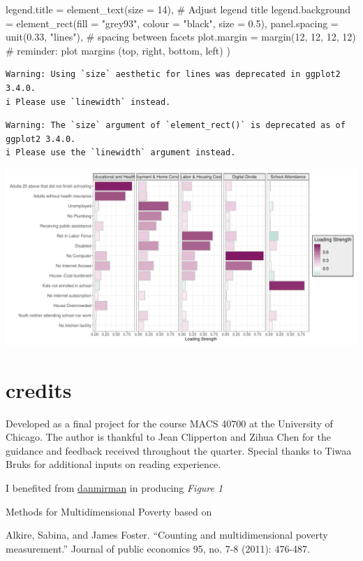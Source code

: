 \documentclass[
  letterpaper,
  DIV=11,
  numbers=noendperiod]{scrreprt}
\newenvironment{Shaded}{\begin{snugshade}}{\end{snugshade}}
\newcommand{\AttributeTok}[1]{\textcolor[rgb]{0.40,0.45,0.13}{#1}}
\newcommand{\CommentTok}[1]{\textcolor[rgb]{0.37,0.37,0.37}{#1}}
\newcommand{\DecValTok}[1]{\textcolor[rgb]{0.68,0.00,0.00}{#1}}
\newcommand{\FloatTok}[1]{\textcolor[rgb]{0.68,0.00,0.00}{#1}}
\newcommand{\FunctionTok}[1]{\textcolor[rgb]{0.28,0.35,0.67}{#1}}
\newcommand{\NormalTok}[1]{\textcolor[rgb]{0.00,0.23,0.31}{#1}}
\newcommand{\StringTok}[1]{\textcolor[rgb]{0.13,0.47,0.30}{#1}}
\begin{document}
\begin{Shaded}
\begin{Highlighting}[]
    \AttributeTok{legend.title =} \FunctionTok{element\_text}\NormalTok{(}\AttributeTok{size =} \DecValTok{14}\NormalTok{),  }\CommentTok{\# Adjust legend title}
    \AttributeTok{legend.background =} \FunctionTok{element\_rect}\NormalTok{(}\AttributeTok{fill =} \StringTok{"grey93"}\NormalTok{, }\AttributeTok{colour =} \StringTok{"black"}\NormalTok{, }\AttributeTok{size =} \FloatTok{0.5}\NormalTok{),}
    \AttributeTok{panel.spacing =} \FunctionTok{unit}\NormalTok{(}\FloatTok{0.33}\NormalTok{, }\StringTok{"lines"}\NormalTok{),  }\CommentTok{\# spacing between facets}
    \AttributeTok{plot.margin =} \FunctionTok{margin}\NormalTok{(}\DecValTok{12}\NormalTok{, }\DecValTok{12}\NormalTok{, }\DecValTok{12}\NormalTok{, }\DecValTok{12}\NormalTok{)  }\CommentTok{\# reminder: plot margins (top, right, bottom, left)}
\NormalTok{  )}
\end{Highlighting}
\end{Shaded}

\begin{verbatim}
Warning: Using `size` aesthetic for lines was deprecated in ggplot2 3.4.0.
i Please use `linewidth` instead.
\end{verbatim}

\begin{verbatim}
Warning: The `size` argument of `element_rect()` is deprecated as of ggplot2 3.4.0.
i Please use the `linewidth` argument instead.
\end{verbatim}

\includegraphics{multidimensional_poverty_files/figure-pdf/viz1-1.pdf}


\chapter{credits}\label{credits}

Developed as a final project for the course MACS 40700 at the University
of Chicago. The author is thankful to Jean Clipperton and Zihua Chen for
the guidance and feedback received throughout the quarter. Special
thanks to Tiwaa Bruks for additional inputs on reading experience.

I benefited from
\href{https://rpubs.com/danmirman/plotting_factor_analysis}{danmirman}
in producing \emph{Figure 1}

Methods for Multidimensional Poverty based on

Alkire, Sabina, and James Foster. ``Counting and multidimensional
poverty measurement.'' Journal of public economics 95, no. 7-8 (2011):
476-487.
\end{document}
